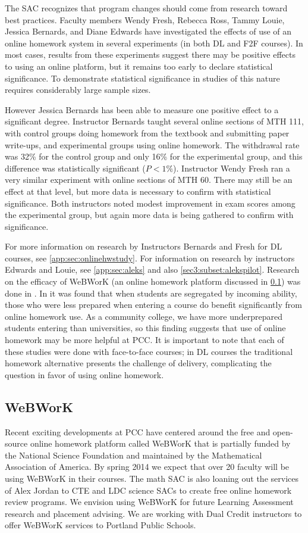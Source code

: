 The SAC recognizes that program changes should come from research toward best practices.  Faculty members Wendy Fresh, Rebecca Ross, Tammy Louie, Jessica Bernards, and Diane Edwards have investigated the effects of use of an online homework system in several experiments (in both DL and F2F courses). In most cases, results from these experiments suggest there may be positive effects to using an online platform, but it remains too early to declare statistical significance. To demonstrate statistical significance in studies of this nature requires considerably large sample sizes. 

However Jessica Bernards has been able to measure one positive effect to a significant degree. Instructor Bernards taught several online sections of MTH 111, with control groups doing homework from the textbook and submitting paper write-ups, and experimental groups using online homework. The withdrawal rate was 32\% for the control group and only 16\% for the experimental group, and this difference was statistically significant ($P<1\%$).  Instructor Wendy Fresh ran a very similar experiment with online sections of MTH 60. There may still be an effect at that level, but more data is necessary to confirm with statistical significance. Both instructors noted modest improvement in exam scores among the experimental group, but again more data is being gathered to confirm with significance.

For more information on research by Instructors Bernards and Fresh for DL courses, see \vref{app:sec:onlinehwstudy}. For information on research by instructors Edwards and Louie, see \vref{app:sec:aleks} and also \cref{sec3:subset:alekspilot}. Research on the efficacy of WeBWorK (an online homework platform discussed in \ref{other:sec:webwork}) was done in \cite{focuswebwork}.  In \cite{brewer} it was found that when students are segregated by incoming ability, those who were less prepared when entering a course do benefit significantly from online homework use. As a community college, we have more underprepared students entering than universities, so this finding suggests that use of online homework may be more helpful at PCC. It is important to note that each of these studies were done with face-to-face courses; in DL courses the traditional homework alternative presents the challenge of delivery, complicating the question in favor of using online homework.

\subsection{WeBWorK}\label{other:sec:webwork}
Recent exciting developments at PCC have centered around the free and open-source online homework platform called WeBWorK that is partially funded by the National Science Foundation and maintained by the Mathematical Association of America. By spring 2014 we expect that over 20 faculty will be using WeBWorK in their courses. The math SAC is also loaning out the services of Alex Jordan to CTE and LDC science SACs to create free online homework review programs. We envision using WeBWorK for future Learning Assessment research and placement advising. We are working with Dual Credit instructors to offer WeBWorK services to Portland Public Schools.

